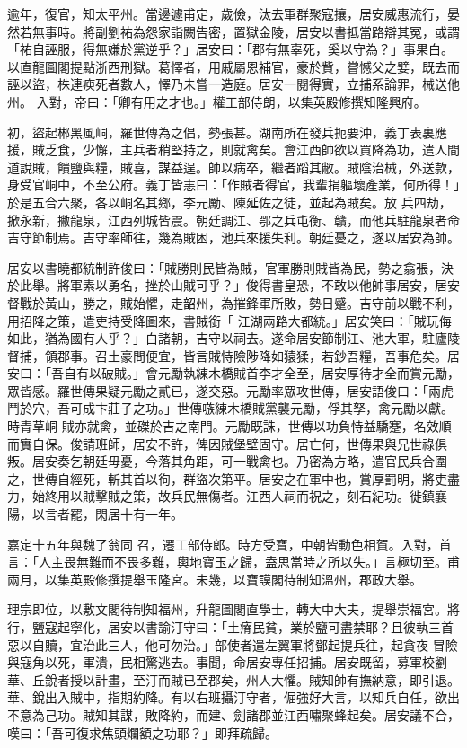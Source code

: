 \begin{pinyinscope}
 逾年，復官，知太平州。當邊遽甫定，歲儉，汰去軍群聚寇攘，居安威惠流行，晏然若無事時。將副劉祐為怨家詣闕告密，置獄金陵，居安以書抵當路辯其冤，或謂「祐自誣服，得無嫌於黨逆乎？」居安曰：「郡有無辜死，奚以守為？」事果白。以直龍圖閣提點浙西刑獄。葛懌者，用戚屬恩補官，豪於貲，嘗憾父之嬖，既去而誣以盜，株連瘐死者數人，懌乃未嘗一造庭。居安一閱得實，立捕系論罪，械送他州。
 入對，帝曰：「卿有用之才也。」權工部侍朗，以集英殿修撰知隆興府。



 初，盜起郴黑風峒，羅世傳為之倡，勢張甚。湖南所在發兵扼要沖，義丁表裏應援，賊乏食，少懈，主兵者稍堅持之，則就禽矣。會江西帥欲以買降為功，遣人間道說賊，饋鹽與糧，賊喜，謀益逞。帥以病卒，繼者蹈其敝。賊陰治械，外送款，身受官峒中，不至公府。義丁皆恚曰：「作賊者得官，我輩捐軀壞產業，何所得！」於是五合六聚，各以峒名其鄉，李元勵、陳延佐之徒，並起為賊矣。放
 兵四劫，掀永新，撇龍泉，江西列城皆震。朝廷調江、鄂之兵屯衡、贛，而他兵駐龍泉者命吉守節制焉。吉守率師往，幾為賊困，池兵來援失利。朝廷憂之，遂以居安為帥。



 居安以書曉都統制許俊曰：「賊勝則民皆為賊，官軍勝則賊皆為民，勢之翕張，決於此舉。將軍素以勇名，挫於山賊可乎？」俊得書皇恐，不敢以他帥事居安，居安督戰於黃山，勝之，賊始懼，走韶州，為摧鋒軍所敗，勢日蹙。吉守前以戰不利，用招降之策，遣吏持受降圖來，書賊銜「
 江湖兩路大都統。」居安笑曰：「賊玩侮如此，猶為國有人乎？」白諸朝，吉守以祠去。遂命居安節制江、池大軍，駐廬陵督捕，領郡事。召土豪問便宜，皆言賊恃險陟降如猿猱，若鈔吾糧，吾事危矣。居安曰：「吾自有以破賊。」會元勵執練木橋賊首李才全至，居安厚待才全而賞元勵，眾皆感。羅世傳果疑元勵之貳已，遂交惡。元勵率眾攻世傳，居安語俊曰：「兩虎鬥於穴，吾可成卞莊子之功。」世傳嗾練木橋賊黨襲元勵，俘其孥，禽元勵以獻。時青草峒
 賊亦就禽，並磔於吉之南門。元勵既誅，世傳以功負恃益驕蹇，名效順而實自保。俊請班師，居安不許，俾因賊堡壁固守。居亡何，世傳果與兄世祿俱叛。居安奏乞朝廷毋憂，今落其角距，可一戰禽也。乃密為方略，遣官民兵合圍之，世傳自經死，斬其首以徇，群盜次第平。居安之在軍中也，賞厚罰明，將吏盡力，始終用以賊擊賊之策，故兵民無傷者。江西人祠而祝之，刻石紀功。徙鎮襄陽，以言者罷，閑居十有一年。



 嘉定十五年與魏了翁同
 召，遷工部侍郎。時方受寶，中朝皆動色相賀。入對，首言：「人主畏無難而不畏多難，輿地寶玉之歸，盍思當時之所以失。」言極切至。甫兩月，以集英殿修撰提舉玉隆宮。未幾，以寶謨閣待制知溫州，郡政大舉。



 理宗即位，以敷文閣待制知福州，升龍圖閣直學士，轉大中大夫，提舉崇福宮。將行，鹽寇起寧化，居安以書諭汀守曰：「土瘠民貧，業於鹽可盡禁耶？且彼執三首惡以自贖，宜治此三人，他可勿治。」部使者遣左翼軍將鄧起提兵往，起貪夜
 冒險與寇角以死，軍潰，民相驚逃去。事聞，命居安專任招捕。居安既留，募軍校劉華、丘銳者授以計畫，至汀而賊已至郡矣，州人大懼。賊知帥有撫納意，即引退。華、銳出入賊中，指期約降。有以右班攝汀守者，倔強好大言，以知兵自任，欲出不意為己功。賊知其謀，敗降約，而建、劍諸郡並江西嘯聚蜂起矣。居安議不合，嘆曰：「吾可復求焦頭爛額之功耶？」即拜疏歸。




\end{pinyinscope}
